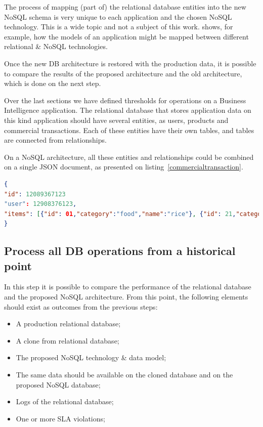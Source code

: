 The process of mapping (part of) the relational database entities into the new NoSQL schema is very unique to each application and the chosen NoSQL technology. This is a wide topic and not a subject of this work. \cite{bahl2014mysql} shows, for example, how the models of an application might be mapped between different relational \& NoSQL technologies.

Once the new DB architecture is restored with the production data, it is possible to compare the results of the proposed architecture and the old architecture, which is done on the next step.

Over the last sections we have defined thresholds for operations on a Business Intelligence application. The relational database that stores application data on this kind application should have several entities, as users, products and commercial transactions. Each of these entities have their own tables, and tables are connected from relationships. 

On a NoSQL architecture, all these entities and relationships could be combined on a single JSON document, as presented on listing~\ref{commercialtransaction}. 

\begin{lstlisting}[language=json,firstnumber=1, caption=BI application commercial transaction represented as a single document., label=commercialtransaction]
{
"id": 12089367123
"user": 12908376123,
"items": [{"id": 01,"category":"food","name":"rice"}, {"id": 21,"category":"drinks","name":"soda"}]
}
\end{lstlisting}
\subsection{Process all DB operations from a historical point}

In this step it is possible to compare the performance of the relational database and the proposed NoSQL architecture. From this point, the following elements should exist as outcomes from the previous steps: 

\begin{itemize}
\item{A production relational database;}
\item{A clone from relational database;}
\item{The proposed NoSQL technology \& data model;}
\item{The same data should be available on the cloned database and on the proposed NoSQL database;}
\item{Logs of the relational database;}
\item{One or more SLA violations;}
\end{itemize}

